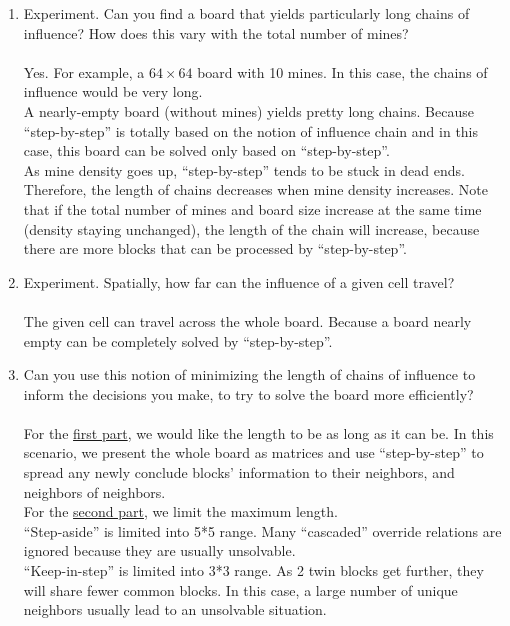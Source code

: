 \documentclass[letter]{article}
\begin{document}
\begin{enumerate}
	\item {Experiment. Can you find a board that yields particularly long chains of influence? How does this vary with the total number of mines?} \\
	\\
	Yes. For example, a $ 64 \times 64 $ board with 10 mines. In this case, the chains of influence would be very long. 
	\\
	A nearly-empty board (without mines) yields pretty long chains. Because ``step-by-step'' is totally based on the notion of influence chain and in this case, this board can be solved only based on ``step-by-step''. 
	\\
	As mine density goes up, ``step-by-step'' tends to be stuck in dead ends. Therefore, the length of chains decreases when mine density increases. Note that if the total number of mines and board size increase at the same time (density staying unchanged), the length of the chain will increase, because there are more blocks that can be processed by ``step-by-step''.
	\\
	\item {Experiment. Spatially, how far can the influence of a given cell travel?} \\
	\\
	The given cell can travel across the whole board. Because a board nearly empty can be completely solved by ``step-by-step''.
	\\
	\item {Can you use this notion of minimizing the length of chains of influence to inform the decisions you make, to try to solve the board more efficiently?} \\
	\\
	For the \hyperref[firstpart]{first part}, we would like the length to be as long as it can be. In this scenario, we present the whole board as matrices and use ``step-by-step'' to spread any newly conclude blocks’ information to their neighbors, and neighbors of neighbors.
	\\
	For the \hyperref[secondpart]{second part}, we limit the maximum length. \\
	``Step-aside'' is limited into 5*5 range. Many ``cascaded'' override relations are ignored because they are usually unsolvable. \\
	``Keep-in-step'' is limited into 3*3 range. As 2 twin blocks get further, they will share fewer common blocks. In this case, a large number of unique neighbors usually lead to an unsolvable situation. \\

\end{enumerate}
\end{document}
